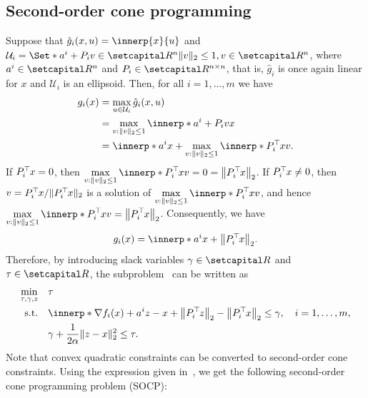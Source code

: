 \documentclass[../../main]{subfiles}
\begin{document}
\subsection{Second-order cone programming} 
Suppose that $\hat{g}_i (x,u) = \innerp{x}{u}$ and ${\mathcal{U}}_i = \Set*{ a^i + P_i v \in \setR^n }{ \norm{v}_2 \leq 1, v \in \setR^n }$, where $a^i \in \setR^n$ and $P_i \in \setR^{n \times n}$, that is, $\hat{g}_i$ is once again linear for $x$ and $\mathcal{U}_i$ is an ellipsoid.
Then, for all $i = 1,\dots,m$ we have
\begin{align}
    g_i (x) & =  \max_{u \in {\mathcal{U}}_i } \hat{g}_i (x,u)                         \\
            & =\max_{v : \norm{v}_2 \leq 1} \innerp*{a^i + P_i v}{x}                   \\
            & = \innerp*{a^i}{x} + \max_{v : \norm{v}_2 \leq 1} \innerp*{P_i^\T x}{v}.
\end{align}
If $P_i^\top\hspace{-1pt} x = 0$, then $\displaystyle \max_{v : \norm{v}_2 \leq 1} \innerp*{P_i^\T x}{v} = 0 = \norm*{P_i^\T x}_2$.
If $P_i^\top\hspace{-1pt} x \neq 0$, then $v = P_i^\top\hspace{-1pt} x / \lVert P_i^\top\hspace{-1pt} x\rVert_2$ is a solution of $\displaystyle \max_{v : \norm{v}_2 \leq 1} \innerp*{P_i^\T x}{v}$, and hence $\displaystyle \max_{v : \norm{v}_2 \leq 1} \innerp*{P_i^\T x}{v} = \norm*{P_i^\T x}_2$.
Consequently, we have
\begin{equation}
    g_i(x) = \innerp*{a^i}{x} + \norm*{P_i^\T x}_2.
\end{equation}
Therefore, by introducing slack variables $\gamma \in \setR$ and $\tau \in \setR$, the subproblem~ can be written as
\begin{equation}
    \begin{aligned}
        \min_{\tau, \gamma, z} \quad & \tau                                                                                                              \\
        \st    \quad                 & \innerp*{\nabla f_i(x) + a^i}{z - x} + \norm*{P_i^\T z}_2 - \norm*{P_i^\T x}_2 \leq \gamma, \quad i = 1,\ldots,m, \\
                                     & \gamma + \frac{1}{2 \alpha} \norm{z - x}_2^2 \leq \tau.
    \end{aligned}
\end{equation}
Note that convex quadratic constraints can be converted to second-order cone constraints.
Using the expression given in~\cite[Section 2.1]{Alizadeh2003}, we get the following second-order cone programming problem (SOCP):
\end{document}
